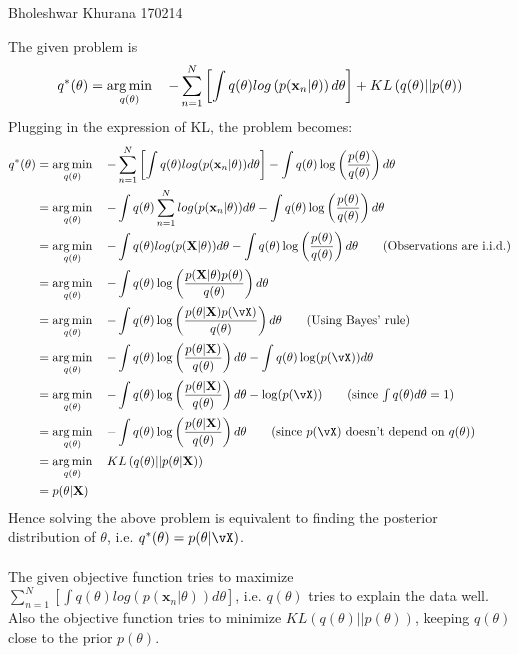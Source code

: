 \documentclass[a4paper,11pt]{article}
\begin{document}
{Bholeshwar Khurana}   %
{170214}	%

\begin{pmisolution}
\noindent The given problem is
\begin{equation*}
    q^*(\theta) = \mathop{\arg\min}_{q(\theta)} ~~~ -\sum_{n=1}^N \left[\int q(\theta) log\left(p(\textbf{x}_n|\theta)\right)d\theta\right] + KL\left(q(\theta)||p(\theta)\right)
\end{equation*}
Plugging in the expression of KL, the problem becomes:
\begin{align}
    q^*(\theta) &=\argmin_{q(\theta)} ~~~ -\sum_{n=1}^N \left[\int q(\theta) log(p(\textbf{x}_n|\theta))d\theta\right] - \int q(\theta) \log \left(\frac{p(\theta)}{q(\theta)}\right)d\theta
    \nonumber
    \\&=\argmin_{q(\theta)} ~~~ - \int q(\theta) \sum_{n=1}^Nlog(p(\textbf{x}_n|\theta))d\theta - \int q(\theta) \log \left(\frac{p(\theta)}{q(\theta)}\right)d\theta
    \nonumber
    \\&=\argmin_{q(\theta)} ~~~ - \int q(\theta) log(p(\textbf{X}|\theta))d\theta - \int q(\theta) \log \left(\frac{p(\theta)}{q(\theta)}\right)d\theta \tag{Observations are i.i.d.}
    \\&=\argmin_{q(\theta)} ~~~ - \int q(\theta) \log \left(\frac{p(\textbf{X}|\theta)p(\theta)}{q(\theta)}\right)d\theta
    \nonumber
    \\&=\argmin_{q(\theta)} ~~~ - \int q(\theta) \log \left(\frac{p(\theta|\textbf{X})p(\vX)}{q(\theta)}\right)d\theta \tag{Using Bayes' rule}
    \nonumber
    \\&=\argmin_{q(\theta)} ~~~ - \int q(\theta) \log \left(\frac{p(\theta|\textbf{X})}{q(\theta)}\right)d\theta - \int q(\theta) \log(p(\vX))d\theta
    \nonumber
    \\&=\argmin_{q(\theta)} ~~~ - \int q(\theta) \log \left(\frac{p(\theta|\textbf{X})}{q(\theta)}\right)d\theta - \log(p(\vX)) \tag{since $\int q(\theta)d\theta = 1$}
    \nonumber
    \\&=\argmin_{q(\theta)} ~~~ - \int q(\theta) \log \left(\frac{p(\theta|\textbf{X})}{q(\theta)}\right)d\theta  \tag{since $p(\vX)$ doesn't depend on $q(\theta)$}
    \nonumber
    \\ &=\argmin_{q(\theta)} ~~~ KL\left(q(\theta) || p(\theta|\textbf{X})\right)
    \nonumber
    \\ &= p(\theta|\textbf{X})
    \nonumber
    \end{align}
Hence solving the above problem is equivalent to finding the posterior distribution of $\theta$, i.e. $q^*(\theta) = p(\theta|\vX)$.
\\ \\
\noindent The given objective function tries to maximize $\sum_{n=1}^N \left[\int q(\theta) log\left(p(\textbf{x}_n|\theta)\right)d\theta\right]$, i.e. $q(\theta)$ tries to explain the data well. Also the objective function tries to minimize $ KL\left(q(\theta) || p(\theta)\right)$, keeping $q(\theta)$ close to the prior $p(\theta)$.

\end{pmisolution}
\end{document}
